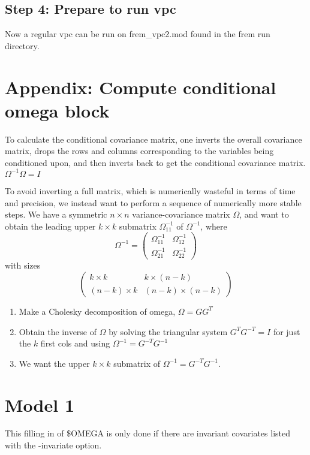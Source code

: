 \subsection{Step 4: Prepare to run  vpc}
Now a regular vpc can be run on frem\_vpc2.mod found in the frem run directory.


\section{Appendix: Compute conditional omega block}
To calculate the conditional covariance matrix,
one inverts the overall covariance matrix,
drops the rows and columns corresponding to the variables being conditioned upon, and then inverts back to get the conditional covariance matrix.
\begin{math}
\Omega^{-1}\Omega = I
\end{math}

To avoid inverting a full matrix, which is numerically wasteful in terms of time and precision, we instead want to perform a sequence of numerically more stable steps.
We have a symmetric $n\times n$ variance-covariance matrix $\Omega$, and want to obtain the leading upper $k\times k$ submatrix $\Omega^{-1}_{11}$
of $\Omega^{-1}$, where
\[
\Omega^{-1} = \left( \begin{array}{cc}
\Omega^{-1}_{11} & \Omega^{-1}_{12}\\
\Omega^{-1}_{21} & \Omega^{-1}_{22}
\end{array} \right)
\] with sizes \[
\left(
\begin{array}{cc}
k\times k & k\times (n-k)\\
(n-k)\times k & (n-k)\times (n-k)
\end{array}
\right)
\]
\begin{enumerate}
\item Make a Cholesky decomposition of omega, $\Omega=GG^T$
\item Obtain the inverse of $\Omega$ by solving the triangular system $G^{T}G^{-T}=I$ for just the $k$ first cols and using $\Omega^{-1}=G^{-T}G^{-1}$
\item We want the upper $k\times k$ submatrix of $\Omega^{-1}=G^{-T}G^{-1}$.
\end{enumerate}




\section{Model 1}
This filling in of \$OMEGA is only done if there are invariant covariates listed with the -invariate option.

